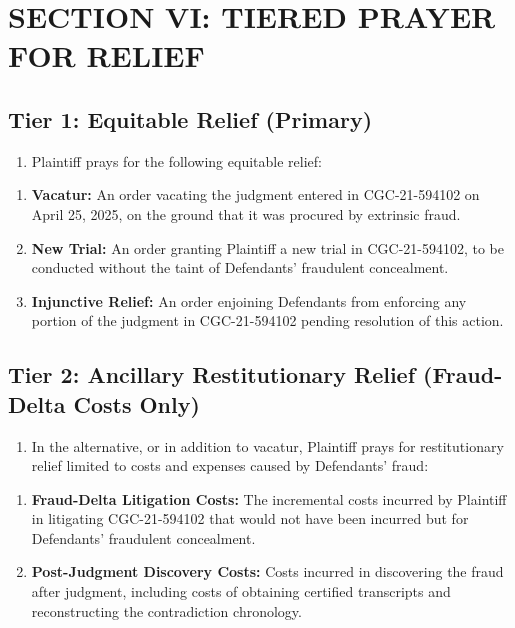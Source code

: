 \section{SECTION VI: TIERED PRAYER FOR RELIEF}\label{section-vi-tiered-prayer-for-relief}

\subsection{Tier 1: Equitable Relief (Primary)}\label{tier-1-equitable-relief-primary}

\begin{enumerate}
\def\labelenumi{\arabic{enumi}.}
\setcounter{enumi}{34}
\tightlist
\item
  Plaintiff prays for the following equitable relief:
\end{enumerate}

\begin{enumerate}
\def\labelenumi{(\alph{enumi})}
\item
  \textbf{Vacatur:} An order vacating the judgment entered in CGC-21-594102 on April 25, 2025, on the ground that it was procured by extrinsic fraud.
\item
  \textbf{New Trial:} An order granting Plaintiff a new trial in CGC-21-594102, to be conducted without the taint of Defendants' fraudulent concealment.
\item
  \textbf{Injunctive Relief:} An order enjoining Defendants from enforcing any portion of the judgment in CGC-21-594102 pending resolution of this action.
\end{enumerate}

\subsection{Tier 2: Ancillary Restitutionary Relief (Fraud-Delta Costs Only)}\label{tier-2-ancillary-restitutionary-relief-fraud-delta-costs-only}

\begin{enumerate}
\def\labelenumi{\arabic{enumi}.}
\setcounter{enumi}{35}
\tightlist
\item
  In the alternative, or in addition to vacatur, Plaintiff prays for restitutionary relief limited to costs and expenses caused by Defendants' fraud:
\end{enumerate}

\begin{enumerate}
\def\labelenumi{(\alph{enumi})}
\item
  \textbf{Fraud-Delta Litigation Costs:} The incremental costs incurred by Plaintiff in litigating CGC-21-594102 that would not have been incurred but for Defendants' fraudulent concealment.
\item
  \textbf{Post-Judgment Discovery Costs:} Costs incurred in discovering the fraud after judgment, including costs of obtaining certified transcripts and reconstructing the contradiction chronology.
\end{enumerate}

